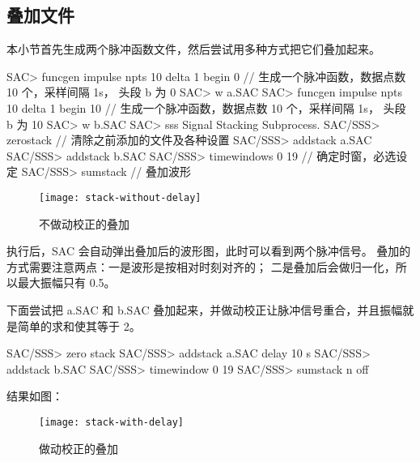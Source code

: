 \subsection{叠加文件}

本小节首先生成两个脉冲函数文件，然后尝试用多种方式把它们叠加起来。

\begin{SACCode}
SAC> funcgen impulse npts 10 delta 1 begin 0
// 生成一个脉冲函数，数据点数 10 个，采样间隔 1s， 头段 b 为 0
SAC> w a.SAC
SAC> funcgen impulse npts 10 delta 1 begin 10
// 生成一个脉冲函数，数据点数 10 个，采样间隔 1s， 头段 b 为 10
SAC> w b.SAC
SAC> sss
 Signal Stacking Subprocess.
SAC/SSS> zerostack         // 清除之前添加的文件及各种设置
SAC/SSS> addstack a.SAC
SAC/SSS> addstack b.SAC
SAC/SSS> timewindows 0 19    // 确定时窗，必选设定
SAC/SSS> sumstack    // 叠加波形
\end{SACCode}

\begin{figure}[H]
\centering
\texttt{[image: stack-without-delay]}
\caption{不做动校正的叠加}
\label{fig:stack-without-delay}
\end{figure}

执行后，SAC 会自动弹出叠加后的波形图，此时可以看到两个脉冲信号。
叠加的方式需要注意两点：一是波形是按相对时刻对齐的；
二是叠加后会做归一化，所以最大振幅只有 0.5。

下面尝试把 a.SAC 和 b.SAC 叠加起来，并做动校正让脉冲信号重合，并且振幅就是简单的求和使其等于 2。

\begin{SACCode}
SAC/SSS> zero stack
SAC/SSS> addstack a.SAC delay 10 s
SAC/SSS> addstack b.SAC
SAC/SSS> timewindow 0 19
SAC/SSS> sumstack n off
\end{SACCode}

结果如图：

\begin{figure}[H]
\centering
\texttt{[image: stack-with-delay]}
\caption{做动校正的叠加}
\label{fig:stack-with-delay}
\end{figure}
